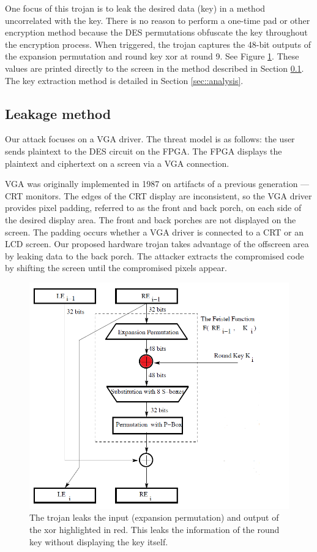 	One focus of this trojan is to leak the desired data (key) in a method uncorrelated with the key. There is no reason to perform a one-time pad or other encryption method because the DES permutations obfuscate the key throughout the encryption process. When triggered, the trojan captures the 48-bit outputs of the expansion permutation and round key xor at round 9. See Figure \ref{fig:des}. These values are printed directly to the screen in the method described in Section \ref{s:leak}. The key extraction method is detailed in Section \ref{sec::analysis}. 


	\subsection{Leakage method}\label{s:leak}
	Our attack focuses on a VGA driver. The threat model is as follows: the user sends plaintext to the DES circuit on the FPGA. The FPGA displays the plaintext and ciphertext on a screen via a VGA connection. 

	VGA was originally implemented in 1987 on artifacts of a previous generation --- CRT monitors. The edges of the CRT display are inconsistent, so the VGA driver provides pixel padding, referred to as the front and back porch, on each side of the desired display area. The front and back porches are not displayed on the screen. The padding occurs whether a VGA driver is connected to a CRT or an LCD screen. Our proposed hardware trojan takes advantage of the offscreen area by leaking data to the back porch. The attacker extracts the compromised code by shifting the screen until the compromised pixels appear. 


		\begin{figure}[htbp]
		\centering
		\includegraphics[scale=.4]{des}
		\caption{The trojan leaks the input (expansion permutation) and output of the xor highlighted in red. This leaks the information of the round key without displaying the key itself. }\label{fig:des}
		\end{figure}

